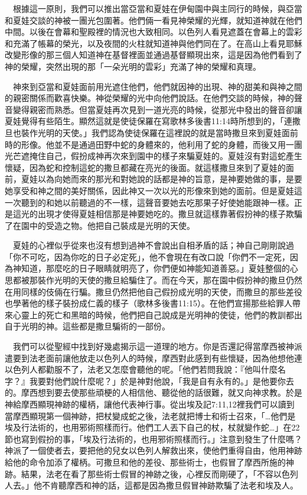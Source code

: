 \documentclass{book}
\begin{document}
　根據這一原則，我們可以推出當亞當和夏娃在伊甸園中與主同行的時候，與亞當和夏娃交談的神被一團光包圍著。他們倆一看見神榮耀的光輝，就知道神就在他們中間。以後在會幕和聖殿裡的情況也大致相同。以色列人看見遮蓋在會幕上的雲彩和充滿了帳幕的榮光，以及夜間的火柱就知道神與他們同在了。在高山上看見耶穌改變形像的那三個人知道神在基督裡面並通過基督顯現出來，這是因為他們看到了神的榮耀，突然出現的那「一朵光明的雲彩」充滿了神的榮耀和真理。

　神來到亞當和夏娃面前用光遮住他們，他們就因神的出現、神的甜美和與神之間的親密關係而歡喜快樂。神從榮耀的光中向他們說話。在他們交談的時候，神的聲音變得親密而熟悉。但當夏娃再次見到一道光亮的時候，從那光中發出的聲音卻讓夏娃覺得有些陌生。顯然這就是使徒保羅在寫歌林多後書11:14時所想到的，「連撒旦也裝作光明的天使。」我們認為使徒保羅在這裡說的就是當時撒旦來到夏娃面前時的形像。他並不是通過田野中蛇的身體來的，他利用了蛇的身體，而後又用一團光芒遮掩住自己，假扮成神再次來到園中的樣子來騙夏娃的。夏娃沒有對這蛇產生懷疑，因為蛇和控制這蛇的撒旦都藏在亮光的後面。就這樣撒旦來到了夏娃的面前，夏娃以為向她而來的那光和對她說的話都是神的旨意，是神要她做的事，是要她享受和神之間的美好關係，因此神又一次以光的形像來到她的面前。但是夏娃這一次聽到的和她以前聽過的不一樣，這聲音要她去吃那果子好使她能跟神一樣。正是這光的出現才使得夏娃相信那是神要她吃的。撒旦就這樣靠著假扮神的樣子欺騙了在園中的受造之物。他把自己裝成是光明的天使。

　夏娃的心裡似乎從來也沒有想到過神不會說出自相矛盾的話；神自己剛剛說過「你不可吃，因為你吃的日子必定死」，他不會現在有改口說「你們不一定死，因為神知道，那麼吃的日子眼睛就明亮了，你們便如神能知道善惡。」夏娃整個的心思都被那裝作光明的天使的撒旦給騙住了。而在今天，那在園中假扮神的撒旦仍然在用同樣的伎倆在行騙。撒旦仍然把他自己假扮成光明的天使，而撒旦的那些差役也學著他的樣子裝扮成仁義的樣子（歌林多後書11:15）。在他們宣揚那些給罪人帶來心靈上的死亡和黑暗的時候，他們把自己說成是光明神的使徒，他們的教訓都出自于光明的神。這些都是撒旦騙術的一部份。

　我們可以從聖經中找到好幾處揭示這一道理的地方。你是否還記得當摩西被神派遣要到法老面前讓他放走以色列人的時候，摩西對此感到有些懷疑，因為他想他連以色列人都勸服不了，法老又怎麼會聽他的呢。「他們若問我說：『他叫什麼名字？』我要對他們說什麼呢？」於是神對他說，「我是自有永有的。」是他要你去的。摩西想到要去使那些頑梗的人相信他、聽從他的話很難，就又向神求教。於是神給摩西顯現神跡的權柄，讓他代表神行事。從出埃及記7:11,12裡我們可以讀到當摩西顯現第一個神跡，把杖變成蛇之後，法老就把博士和術士召來，「…他們是埃及行法術的，也用邪術照樣而行。他們工人丟下自己的杖，杖就變作蛇…」在22節也寫到假扮的事，「埃及行法術的，也用邪術照樣而行。」注意到發生了什麼嗎？神派了一個使者去，要把他的兒女以色列人解救出來，使他們重得自由，他用神跡給他的命令加添了權柄。可撒旦和他的差役、那些術士，也假冒了摩西所施的神跡。結果，法老在看了那些術士假冒的神跡之後，心裡反而剛硬了，「不容以色列人去。」他不肯聽摩西和神的話，這都是因為撒旦假冒神跡欺騙了法老和埃及人。
\end{document}
